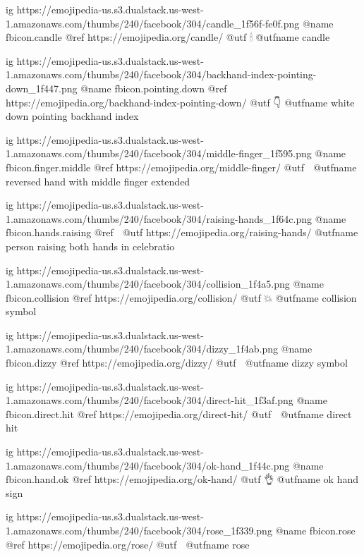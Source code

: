 	ig https://emojipedia-us.s3.dualstack.us-west-1.amazonaws.com/thumbs/240/facebook/304/candle_1f56f-fe0f.png
	@name fbicon.candle
	@ref https://emojipedia.org/candle/
	@utf 🕯
	@utfname candle

	ig https://emojipedia-us.s3.dualstack.us-west-1.amazonaws.com/thumbs/240/facebook/304/backhand-index-pointing-down_1f447.png
	@name fbicon.pointing.down
	@ref https://emojipedia.org/backhand-index-pointing-down/
	@utf 👇
	@utfname white down pointing backhand index

	ig https://emojipedia-us.s3.dualstack.us-west-1.amazonaws.com/thumbs/240/facebook/304/middle-finger_1f595.png
	@name fbicon.finger.middle
	@ref https://emojipedia.org/middle-finger/
	@utf 🖕
	@utfname reversed hand with middle finger extended

	ig https://emojipedia-us.s3.dualstack.us-west-1.amazonaws.com/thumbs/240/facebook/304/raising-hands_1f64c.png
	@name fbicon.hands.raising
	@ref 🙌
	@utf https://emojipedia.org/raising-hands/
	@utfname person raising both hands in celebratio

	ig https://emojipedia-us.s3.dualstack.us-west-1.amazonaws.com/thumbs/240/facebook/304/collision_1f4a5.png
	@name fbicon.collision
	@ref https://emojipedia.org/collision/
	@utf 💥
	@utfname collision symbol

	ig https://emojipedia-us.s3.dualstack.us-west-1.amazonaws.com/thumbs/240/facebook/304/dizzy_1f4ab.png
	@name fbicon.dizzy
	@ref https://emojipedia.org/dizzy/
	@utf 💫
	@utfname dizzy symbol

	ig https://emojipedia-us.s3.dualstack.us-west-1.amazonaws.com/thumbs/240/facebook/304/direct-hit_1f3af.png
	@name fbicon.direct.hit
	@ref https://emojipedia.org/direct-hit/
	@utf 🎯
	@utfname direct hit

	ig https://emojipedia-us.s3.dualstack.us-west-1.amazonaws.com/thumbs/240/facebook/304/ok-hand_1f44c.png
	@name fbicon.hand.ok
	@ref https://emojipedia.org/ok-hand/
	@utf 👌
	@utfname ok hand sign

	ig https://emojipedia-us.s3.dualstack.us-west-1.amazonaws.com/thumbs/240/facebook/304/rose_1f339.png
	@name fbicon.rose
	@ref https://emojipedia.org/rose/
	@utf 🌹
	@utfname rose

\fi


